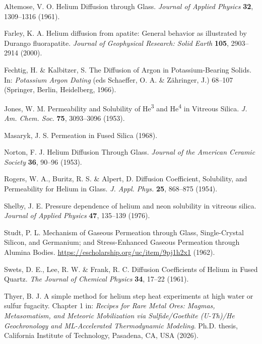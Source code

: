 \documentclass[gchron, manuscript]{copernicus} %
\begin{document}
\begin{thebibliography}{}

Altemose, V. O. Helium Diffusion through Glass. \emph{Journal of Applied Physics} \textbf{32}, 1309--1316 (1961).

Farley, K. A. Helium diffusion from apatite: General behavior as illustrated by Durango fluorapatite. \emph{Journal of Geophysical Research: Solid Earth} \textbf{105}, 2903--2914 (2000).

Fechtig, H. \& Kalbitzer, S. The Diffusion of Argon in Potassium-Bearing Solids. In: \emph{Potassium Argon Dating} (eds Schaeffer, O. A. \& Z\"ahringer, J.) 68--107 (Springer, Berlin, Heidelberg, 1966).

Jones, W. M. Permeability and Solubility of He\textsuperscript{3} and He\textsuperscript{4} in Vitreous Silica. \emph{J. Am. Chem. Soc.} \textbf{75}, 3093--3096 (1953).

Masaryk, J. S. Permeation in Fused Silica (1968).

Norton, F. J. Helium Diffusion Through Glass. \emph{Journal of the American Ceramic Society} \textbf{36}, 90--96 (1953).

Rogers, W. A., Buritz, R. S. \& Alpert, D. Diffusion Coefficient, Solubility, and Permeability for Helium in Glass. \emph{J. Appl. Phys.} \textbf{25}, 868--875 (1954).

Shelby, J. E. Pressure dependence of helium and neon solubility in vitreous silica. \emph{Journal of Applied Physics} \textbf{47}, 135--139 (1976).

Studt, P. L. Mechanism of Gaseous Permeation through Glass, Single-Crystal Silicon, and Germanium; and Stress-Enhanced Gaseous Permeation through Alumina Bodies. \url{https://escholarship.org/uc/item/9pj1h2x1} (1962).

Swets, D. E., Lee, R. W. \& Frank, R. C. Diffusion Coefficients of Helium in Fused Quartz. \emph{The Journal of Chemical Physics} \textbf{34}, 17--22 (1961).

Thyer, B. J. A simple method for helium step heat experiments at high water or sulfur fugacity. Chapter 1 in: \emph{Recipes for Rare Metal Ores: Magmas, Metasomatism, and Meteoric Mobilization via Sulfide/Goethite (U-Th)/He Geochronology and ML-Accelerated Thermodynamic Modeling}. Ph.D. thesis, California Institute of Technology, Pasadena, CA, USA (2026).

\end{thebibliography}
\end{document}
